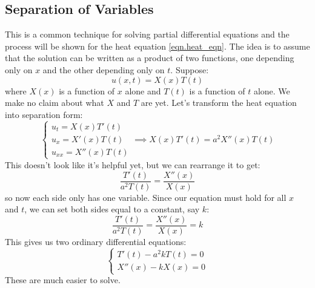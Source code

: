 \subsection{Separation of Variables}\label{subsec.separation_of_variables}
This is a common technique for solving partial differential equations and the process will be shown for the heat equation \eqref{eqn.heat_eqn}. The idea is to assume that the solution can be written as a product of two functions, one depending only on $x$ and the other depending only on $t$. Suppose:
\[
    u(x,t) = X(x)T(t)
\]
where $X(x)$ is a function of $x$ alone and $T(t)$ is a function of $t$ alone. We make no claim about what $X$ and $T$ are yet. Let's transform the heat equation into separation form:
\[
\begin{cases}
    u_t = X(x)T'(t) \\
    u_x = X'(x)T(t) \\
    u_{xx} = X''(x)T(t)
\end{cases}
\implies X(x)T'(t) = a^2 X''(x)T(t)
\]
This doesn't look like it's helpful yet, but we can rearrange it to get:
\[
\frac{T'(t)}{a^2 T(t)} = \frac{X''(x)}{X(x)}
\]
so now each side only has one variable. Since our equation must hold for all $x$ and $t$, we can set both sides equal to a constant, say $k$: 
\[
\frac{T'(t)}{a^2 T(t)} = \frac{X''(x)}{X(x)} = k
\]
This gives us two ordinary differential equations:
\[
\begin{cases}
    T'(t) - a^2 k T(t) = 0 \\
    X''(x) - k X(x) = 0
\end{cases}
\]
These are much easier to solve. 
